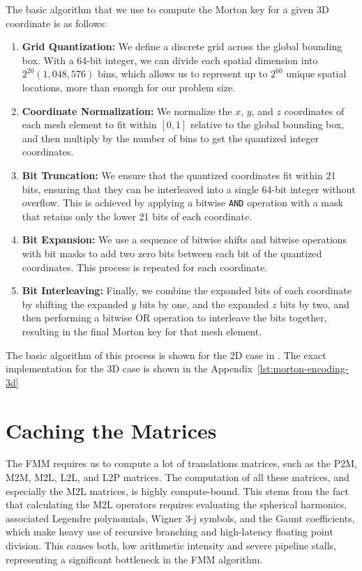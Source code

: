 The basic algorithm that we use to compute the Morton key for a given 3D coordinate is as follows:
\begin{enumerate} [label=\textbf{Step \arabic*.}, leftmargin=*]
    \item \textbf{Grid Quantization:} We define a discrete grid across the global bounding box. With a 64-bit integer, we can divide each spatial dimension into  $2^{20}  \left(1,048,576\right)$ bins, which allows us to represent up to $2^{60}$ unique spatial locations, more than enough for our problem size.
    \item \textbf{Coordinate Normalization:} We normalize the $x$, $y$, and $z$ coordinates of each mesh element to fit within $[0, 1]$ relative to the global bounding box, and then multiply by the number of bins to get the quantized integer coordinates.
    \item \textbf{Bit Truncation:} We ensure that the quantized coordinates fit within 21 bits, ensuring that they can be interleaved into a single 64-bit integer without overflow. This is achieved by applying a bitwise \texttt{AND} operation with a mask that retains only the lower 21 bits of each coordinate.
    \item \textbf{Bit Expansion:} We use a sequence of bitwise shifts and bitwise operations with bit masks to add two zero bits between each bit of the quantized coordinates. This process is repeated for each coordinate.
    \item \textbf{Bit Interleaving:} Finally, we combine the expanded bits of each coordinate by shifting the expanded $y$ bits by one, and the expanded $z$ bits by two, and then performing a bitwise OR operation to interleave the bits together, resulting in the final Morton key for that mesh element.
\end{enumerate} 
The basic algorithm of this process is shown for the 2D case in \cite{bittwiddlinghacks}. The exact implementation for the 3D case is shown in the Appendix~\ref{lst:morton-encoding-3d}
\section{Caching the Matrices} \label{sec:caching-the-matrices}
The \ac{FMM} requires us to compute a lot of translations matrices, such as the \ac{P2M}, \ac{M2M}, \ac{M2L}, \ac{L2L}, and \ac{L2P} matrices. The computation of all these matrices, and especially the \ac{M2L} matrices, is highly compute-bound. This stems from the fact that calculating the \ac{M2L} operators requires evaluating the spherical harmonics, associated Legendre polynomials, Wigner 3-j symbols, and the Gaunt coefficients, which make heavy use of recursive branching and high-latency floating point division. This causes both, low arithmetic intensity and severe pipeline stalls, representing a significant bottleneck in the \ac{FMM} algorithm.

